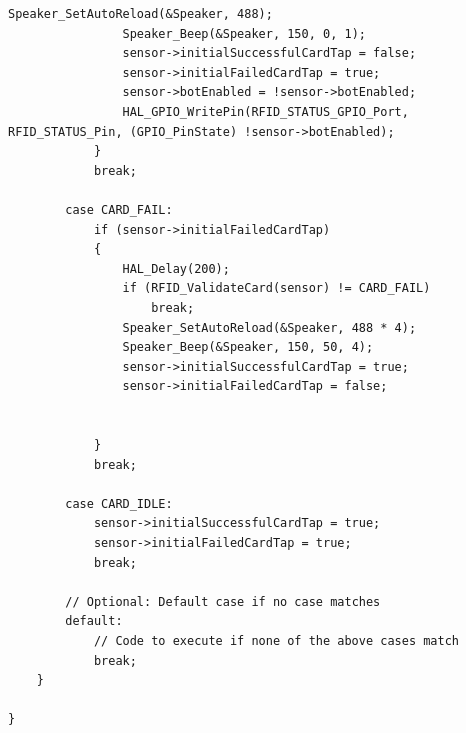 \documentclass{article}
\begin{document}
\begin{lstlisting}[caption={Source Code : STM32 RC522 Firmware}, label={lst:stm32_rfidsensor_code}]
	    		Speaker_SetAutoReload(&Speaker, 488);
	    		Speaker_Beep(&Speaker, 150, 0, 1);
	    		sensor->initialSuccessfulCardTap = false;
	    		sensor->initialFailedCardTap = true;
	    		sensor->botEnabled = !sensor->botEnabled;
	    		HAL_GPIO_WritePin(RFID_STATUS_GPIO_Port, RFID_STATUS_Pin, (GPIO_PinState) !sensor->botEnabled);
	    	}
	        break;

	    case CARD_FAIL:
	    	if (sensor->initialFailedCardTap)
	    	{
	    		HAL_Delay(200);
				if (RFID_ValidateCard(sensor) != CARD_FAIL)
					break;
				Speaker_SetAutoReload(&Speaker, 488 * 4);
				Speaker_Beep(&Speaker, 150, 50, 4);
				sensor->initialSuccessfulCardTap = true;
				sensor->initialFailedCardTap = false;


	    	}
	        break;

	    case CARD_IDLE:
	    	sensor->initialSuccessfulCardTap = true;
	    	sensor->initialFailedCardTap = true;
	        break;

	    // Optional: Default case if no case matches
	    default:
	        // Code to execute if none of the above cases match
	        break;
	}

}

\end{lstlisting}
\end{document}
